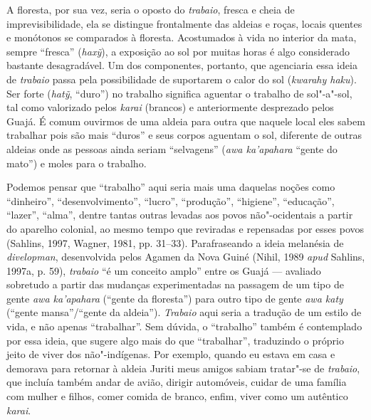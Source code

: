 A floresta, por sua vez, seria o oposto do \emph{trabaio}, fresca e
cheia de imprevisibilidade, ela se distingue frontalmente das aldeias e
roças, locais quentes e monótonos se comparados à floresta. Acostumados
à vida no interior da mata, sempre ``fresca'' (\emph{haxỹ}), a
exposição ao sol por muitas horas é algo considerado bastante
desagradável. Um dos componentes, portanto, que agenciaria essa ideia de
\emph{trabaio} passa pela possibilidade de suportarem o calor do sol
(\emph{kwarahy haku}). Ser forte (\emph{hatỹ}, ``duro'') no trabalho
significa aguentar o trabalho de sol"-a"-sol, tal como valorizado pelos
\emph{karai} (brancos) e anteriormente desprezado pelos Guajá. É comum
ouvirmos de uma aldeia para outra que naquele local eles sabem trabalhar
pois são mais ``duros'' e seus corpos aguentam o sol, diferente de
outras aldeias onde as pessoas ainda seriam ``selvagens'' (\emph{awa
ka'apahara} ``gente do mato'') e moles para o trabalho.

Podemos pensar que ``trabalho'' aqui seria mais uma daquelas noções como
``dinheiro'', ``desenvolvimento'', ``lucro'', ``produção'', ``higiene'',
``educação'', ``lazer'', ``alma'', dentre tantas outras levadas aos
povos não"-ocidentais a partir do aparelho colonial, ao mesmo tempo que
reviradas e repensadas por esses povos (Sahlins, 1997, Wagner, 1981, pp.
31--33). Parafraseando a ideia melanésia de \emph{divelopman},
desenvolvida pelos Agamen da Nova Guiné (Nihil, 1989 \emph{apud} Sahlins, 1997a,
p. 59), \emph{trabaio} ``é um conceito amplo'' entre os Guajá --- avaliado
sobretudo a partir das mudanças experimentadas na passagem de um tipo de
gente \emph{awa ka'apahara} (``gente da floresta'') para outro tipo de
gente \emph{awa katy} (``gente mansa''/``gente da aldeia'').
\emph{Trabaio} aqui seria a tradução de um estilo de vida, e não apenas
``trabalhar''. Sem dúvida, o ``trabalho'' também é contemplado por essa
ideia, que sugere algo mais do que ``trabalhar'', traduzindo o próprio
jeito de viver dos não"-indígenas. Por exemplo, quando eu estava em casa
e demorava para retornar à aldeia Juriti meus amigos sabiam tratar"-se de
\emph{trabaio}, que incluía também andar de avião, dirigir automóveis,
cuidar de uma família com mulher e filhos, comer comida de branco,
enfim, viver como um autêntico \emph{karai}.

